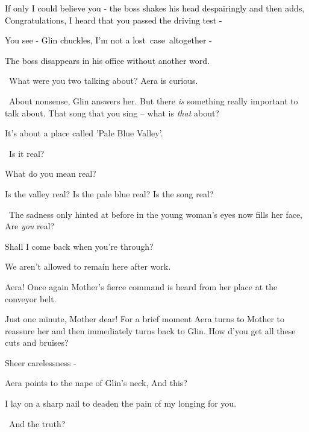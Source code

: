 \documentclass[letterpaper]{article}
\begin{document}
\textcolor{black}{{\textquotedbl}If only I could believe you -{\textquotedbl} the boss shakes his head despairingly and
then adds, {\textquotedbl}Congratulations, I heard that you passed the driving test - {\textquotedbl}}

\textcolor{black}{{\textquotedbl}You see -{\textquotedbl} Glin chuckles, {\textquotedbl}I'm not a lost\ case\ altogether
-{\textquotedbl}}

\textcolor{black}{The boss disappears in his office without another word.\ }

\textcolor{red}{\ }{\textquotedbl}What were you two talking about?{\textquotedbl} Aera is curious.

~{\textquotedbl}About nonsense,{\textquotedbl} Glin answers her. {\textquotedbl}But there \textit{is} something really
important to talk about. That song that you sing -- what is \textit{that} about?{\textquotedbl} 

{\textquotedbl}It's about a place called 'Pale Blue Valley'.{\textquotedbl}

~{\textquotedbl}Is it real?{\textquotedbl}

{\textquotedbl}What do you mean real?{\textquotedbl}

{\textquotedbl}Is the valley real? Is the pale blue real? Is the song real?{\textquotedbl}

~The sadness only hinted at before in the young woman's eyes now fills her face, {\textquotedbl}Are \textit{you}
real?{\textquotedbl} 

{\textquotedbl}Shall I come back when you're through?{\textquotedbl}

{\textquotedbl}We aren't allowed to remain here after work.{\textquotedbl}

{\textquotedbl}Aera!{\textquotedbl} Once again Mother's fierce command is heard from her place at the conveyor belt.\ 

{\textquotedbl}Just one minute, Mother dear!{\textquotedbl} For a brief moment\MakeUppercase{ a}era turns to Mother to
reassure her and then immediately turns back to Glin. {\textquotedbl}How d'you get all these cuts and
bruises?{\textquotedbl} 

{\textquotedbl}Sheer carelessness -{\textquotedbl}

Aera points to the nape of Glin's neck, {\textquotedbl}And this?{\textquotedbl}

{\textquotedbl}I lay on a sharp nail to deaden the pain of my longing for you.{\textquotedbl}

~{\textquotedbl}And the truth?{\textquotedbl} 
\end{document}
